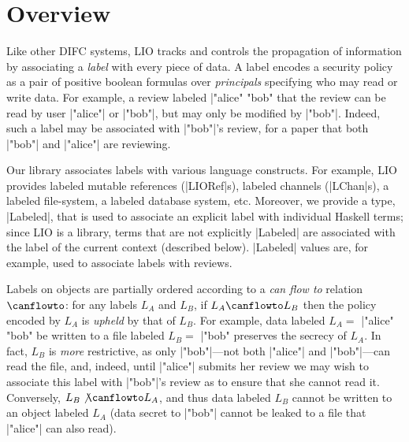 \section{Overview}
\label{sec:overview}

Like other DIFC systems, LIO tracks and controls the propagation of
information by associating a \emph{label} with every piece of
data.
%
A label encodes a security policy as a pair of positive boolean
formulas over \emph{principals} specifying who may read or write data.
%
For example, a review labeled \hs|"alice" \/ "bob" %
that the review can be read by user \hs|"alice"| or \hs|"bob"|, but
may only be modified by \hs|"bob"|.
%
Indeed, such a label may be associated with \hs|"bob"|'s review, for a
paper that both \hs|"bob"| and \hs|"alice"| are reviewing.
%

Our library associates labels with various language constructs.
%
For example, LIO provides labeled mutable references (\hs|LIORef|s),
labeled channels (\hs|LChan|s), a labeled file-system, a labeled
database system, etc.
%
Moreover, we provide a type, \hs|Labeled|, that is used to associate
an explicit label with individual Haskell terms; since LIO is a
library, terms that are not explicitly \hs|Labeled| are associated
with the label of the current context (described below).
%
\hs|Labeled| values are, for example, used to associate labels with
reviews.
%

Labels on objects are partially ordered according to a {\em can flow
  to} relation $\canflowto$: for any labels $L_A$ and $L_B$, if $L_A
  \canflowto L_B$ then the policy encoded by $L_A$ is \emph{upheld}
  by that of $L_B$.
%
For example, data labeled $L_A =$ \hs|"alice" \/ "bob" %
be written to a file labeled $L_B =$ \hs|"bob" %
preserves the secrecy of $L_A$.
%
In fact, $L_B$ is \emph{more} restrictive, as only
\hs|"bob"|---not both \hs|"alice"| and \hs|"bob"|---can read the file,
and, indeed, until \hs|"alice"| submits her review we may wish to
associate this label with \hs|"bob"|'s review as to ensure that she
cannot read it.
%
Conversely, $L_B \not\canflowto L_A$, and thus data labeled $L_B$
cannot be written to an object labeled $L_A$ (data secret to
\hs|"bob"| cannot be leaked to a file that \hs|"alice"| can also
read).

